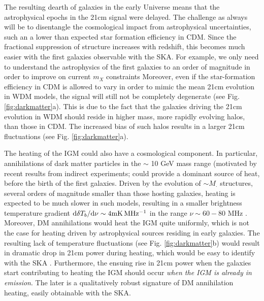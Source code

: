 \documentclass{PoS}
\newcommand{\ud}{{\rm d}}
\begin{document}
The resulting dearth of galaxies in the early Universe means that the astrophysical epochs in the 21cm signal were delayed.  The challenge as always will be to disentangle the cosmological impact from astrophysical uncertainties, such an a lower than expected star formation efficiency in CDM.  Since the fractional suppression of structure increases with redshift, this becomes much easier with the first galaxies observable with the SKA.  For example, we only need to understand the astrophysics of the first galaxies to an order of magnitude in order to improve on current $m_X$ constraints \citep{2014MNRAS.438.2664S}
Moreover, even if the star-formation efficiency in CDM is allowed to vary in order to mimic the mean 21cm evolution in WDM models, the signal will still not be completely degenerate (see Fig. \ref{fig:darkmatter}a).  This is due to the fact that the galaxies driving the 21cm evolution in WDM should reside in higher mass, more rapidly evolving halos, than those in CDM.  The increased bias of such halos results in a larger 21cm fluctuations (see Fig. \ref{fig:darkmatter}a).

The heating of the IGM could also have a cosmological component.  In particular, annihilations of dark matter particles in the $\sim$ 10 GeV mass range (motivated by recent results from indirect experiments; \cite[e.g.][]{2009Natur.458..607A, 2010JCAP...04..014A,2013PhRvL.110n1102A}
could provide a dominant source of heat, before the birth of the first galaxies.  Driven by the evolution of $\sim M_\cdot$ structures, several orders of magnitude smaller than those hosting galaxies, heating is expected to be much slower in such models, resulting in a smaller brightness temperature gradient  $\ud\delta T_b/\ud\nu \sim4 {\rm mK\, MHz^{-1}}$ in the range $\nu \sim 60 - 80$ MHz \citep{2013MNRAS.429.1705V}.  Moreover, DM annihilations would heat the IGM quite uniformly, which is not the case for heating driven by astrophysical sources residing in early galaxies.  The resulting lack of temperature fluctuations (see Fig. \ref{fig:darkmatter}b) would result in dramatic drop in 21cm power during heating, which would be easy to identify with the SKA \citep{2014arXiv1408.1109E}.  Furthermore, the ensuing rise in 21cm power when the galaxies start contributing to heating the IGM should occur {\em when the IGM is already in emission}.  The later is a qualitatively robust signature of DM annihilation heating, easily obtainable with the SKA.
\end{document}
